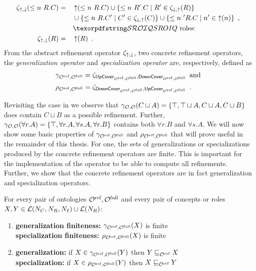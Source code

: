 \begin{definition}
\begin{alignat*}{2}
    \zeta_{\refine,\corefine}(\less n R.C) &= &&\refine(\less n R.C) \cup \{ \less n R'.C \mid R' \in \zeta_{\corefine,\refine}(R) \} \\
    &&& \cup \{ \less n R.C' \mid C' \in \zeta_{\corefine,\refine}(C) \}
    \cup \{ \less n' R.C \mid n' \in \refine(n) \} \enspace, \\
    &&& \text{\SROIQ roles:} \\
    \zeta_{\refine,\corefine}(R) &= &&\refine(R) \enspace.
\end{alignat*}
From the abstract refinement operator $\zeta_{\mathop{\uparrow},\mathop{\downarrow}}$, two concrete refinement operators, the \emph{generalization operator} and \emph{specialization operator} are, respectively, defined as
\begin{align*}
    \gamma_{{\mathcal{O}^\textnormal{ref}},{\mathcal{O}^\textnormal{full}}} &= \zeta_{{\mathsf{UpCover}}_{{\mathcal{O}^\textnormal{ref}},{\mathcal{O}^\textnormal{full}}},{\mathsf{DownCover}}_{{\mathcal{O}^\textnormal{ref}},{\mathcal{O}^\textnormal{full}}}} \enspace \text{and} \\
    \rho_{{\mathcal{O}^\textnormal{ref}},{\mathcal{O}^\textnormal{full}}} &= \zeta_{{\mathsf{DownCover}}_{{\mathcal{O}^\textnormal{ref}},{\mathcal{O}^\textnormal{full}}},{\mathsf{UpCover}}_{{\mathcal{O}^\textnormal{ref}},{\mathcal{O}^\textnormal{full}}}} \enspace.
\end{align*}
\end{definition}

Revisiting the case in  we observe that $\gamma_{\mathcal{O},\mathcal{O}}(C \sqcup A) = \{ \top, \top \sqcup A, C \sqcup A, C \sqcup B \}$ does contain $C \sqcup B$ as a possible refinement. Further, $\gamma_{\mathcal{O},\mathcal{O}}(\forall r.A) = \{ \top, \forall r.A, \forall s.A, \forall r.B \}$ contains both $\forall r.B$ and $\forall s.A$. We will now show some basic properties of $\gamma_{{\mathcal{O}^\textnormal{ref}},{\mathcal{O}^\textnormal{full}}}$ and $\rho_{{\mathcal{O}^\textnormal{ref}},{\mathcal{O}^\textnormal{full}}}$ that will prove useful in the remainder of this thesis. For one, the sets of generalizations or specializations produced by the concrete refinement operators are finite. This is important for the implementation of the operator to be able to compute all refinements. Further, we show that the concrete refinement operators are in fact generalization and specialization operators.

\begin{lemma}\label{lem:basic}
For every pair of \SROIQ ontologies ${\mathcal{O}^\textnormal{ref}}, {\mathcal{O}^\textnormal{full}}$ and every pair of concepts or roles $X, Y \in \mathcal{L}(N_C, N_R, N_I) \cup \mathcal{L}(N_R)$:
\newcommand\litem[1]{\item{\bfseries #1:\enspace }}
\begin{enumerate}
    \litem{generalization finiteness}\label{lem:finiteness} $\gamma_{{\mathcal{O}^\textnormal{ref}},{\mathcal{O}^\textnormal{full}}}(X)$ is finite \\
    \textbf{specialization finiteness:\enspace} $\rho_{{\mathcal{O}^\textnormal{ref}},{\mathcal{O}^\textnormal{full}}}(X)$ is finite
    \litem{generalization}\label{lem:generalisation} if $X \in \gamma_{{\mathcal{O}^\textnormal{ref}},{\mathcal{O}^\textnormal{full}}}(Y)$ then $Y \sqsubseteq_{{\mathcal{O}^\textnormal{ref}}} X$ \\
    \textbf{specialization:\enspace} if $X \in \rho_{{\mathcal{O}^\textnormal{ref}},{\mathcal{O}^\textnormal{full}}}(Y)$ then $X \sqsubseteq_{{\mathcal{O}^\textnormal{ref}}} Y$
\end{enumerate}
\end{lemma}

